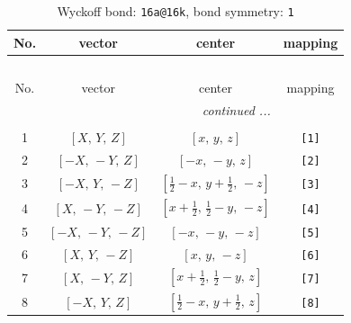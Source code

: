 \documentclass[fleqn,8pt]{jsarticle}
\begin{document}
\begin{longtable}{cccc}
\caption{Wyckoff bond: {\tt 16a@16k}, bond symmetry: {\tt 1}}
 \\
 \hline \hline
No. & vector & center & mapping \\ \hline \endfirsthead

\multicolumn{3}{l}{\tablename\ \thetable{}} \\
 \hline \hline
No. & vector & center & mapping \\ \hline \endhead

 \hline \hline
\multicolumn{3}{r}{\footnotesize\it continued ...} \\ \endfoot

 \hline \hline
\multicolumn{3}{r}{} \\ \endlastfoot

1 & $\left[ X,\, Y,\, Z \right]$ & $\left[ x,\, y,\, z \right]$ & {\tt [1]} \\ \hline
2 & $\left[ - X,\, - Y,\, Z \right]$ & $\left[ - x,\, - y,\, z \right]$ & {\tt [2]} \\ \hline
3 & $\left[ - X,\, Y,\, - Z \right]$ & $\left[ \frac{1}{2} - x,\, y + \frac{1}{2},\, - z \right]$ & {\tt [3]} \\ \hline
4 & $\left[ X,\, - Y,\, - Z \right]$ & $\left[ x + \frac{1}{2},\, \frac{1}{2} - y,\, - z \right]$ & {\tt [4]} \\ \hline
5 & $\left[ - X,\, - Y,\, - Z \right]$ & $\left[ - x,\, - y,\, - z \right]$ & {\tt [5]} \\ \hline
6 & $\left[ X,\, Y,\, - Z \right]$ & $\left[ x,\, y,\, - z \right]$ & {\tt [6]} \\ \hline
7 & $\left[ X,\, - Y,\, Z \right]$ & $\left[ x + \frac{1}{2},\, \frac{1}{2} - y,\, z \right]$ & {\tt [7]} \\ \hline
8 & $\left[ - X,\, Y,\, Z \right]$ & $\left[ \frac{1}{2} - x,\, y + \frac{1}{2},\, z \right]$ & {\tt [8]} \\
\end{longtable}
\end{document}
